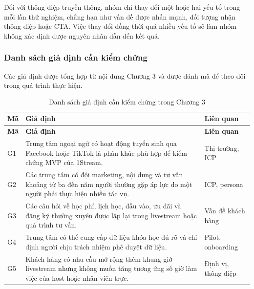 Đối với thông điệp truyền thông, nhóm chỉ thay đổi một hoặc hai yếu tố trong mỗi lần thử nghiệm, chẳng hạn như vấn đề được nhấn mạnh, đối tượng nhận thông điệp hoặc CTA. Việc thay đổi đồng thời quá nhiều yếu tố sẽ làm nhóm không xác định được nguyên nhân dẫn đến kết quả.

\subsubsection{Danh sách giả định cần kiểm chứng}

Các giả định được tổng hợp từ nội dung Chương 3 và được đánh mã để theo dõi trong quá trình thực hiện.

\begin{longtable}{
    p{}
    p{}
    p{}
}
    \caption{Danh sách giả định cần kiểm chứng trong Chương 3}
    \label{tab:chapter-3-assumptions} \\
    \hline
    \textbf{Mã}
    & \textbf{Giả định}
    & \textbf{Liên quan} \\
    \hline
    \endfirsthead

    \hline
    \textbf{Mã}
    & \textbf{Giả định}
    & \textbf{Liên quan} \\
    \hline
    \endhead

    G1
    &
    Trung tâm ngoại ngữ có hoạt động tuyển sinh qua Facebook hoặc TikTok là phân khúc phù hợp để kiểm chứng MVP của 1Stream.
    &
    Thị trường, ICP \\

    \hline

    G2
    &
    Các trung tâm có đội marketing, nội dung và tư vấn khoảng từ ba đến năm người thường gặp áp lực do một người phải thực hiện nhiều tác vụ.
    &
    ICP, persona \\

    \hline

    G3
    &
    Các câu hỏi về học phí, lịch học, đầu vào, ưu đãi và đăng ký thường xuyên được lặp lại trong livestream hoặc quá trình tư vấn.
    &
    Vấn đề khách hàng \\

    \hline

    G4
    &
    Trung tâm có thể cung cấp dữ liệu khóa học đủ rõ và chỉ định người chịu trách nhiệm phê duyệt dữ liệu.
    &
    Pilot, onboarding \\

    \hline

    G5
    &
    Khách hàng có nhu cầu mở rộng thêm khung giờ livestream nhưng không muốn tăng tương ứng số giờ làm việc của host hoặc nhân viên trực.
    &
    Định vị, thông điệp \\


\end{longtable}
